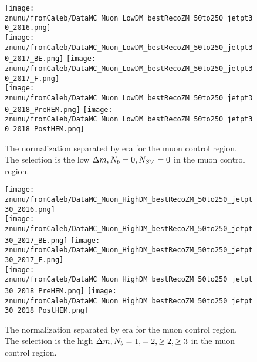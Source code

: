 \begin{figure}[!h]
	\begin{center}
    \texttt{[image: znunu/fromCaleb/DataMC\_Muon\_LowDM\_bestRecoZM\_50to250\_jetpt30\_2016.png]} \\
    \texttt{[image: znunu/fromCaleb/DataMC\_Muon\_LowDM\_bestRecoZM\_50to250\_jetpt30\_2017\_BE.png]} 
    \texttt{[image: znunu/fromCaleb/DataMC\_Muon\_LowDM\_bestRecoZM\_50to250\_jetpt30\_2017\_F.png]} \\
    \texttt{[image: znunu/fromCaleb/DataMC\_Muon\_LowDM\_bestRecoZM\_50to250\_jetpt30\_2018\_PreHEM.png]}
    \texttt{[image: znunu/fromCaleb/DataMC\_Muon\_LowDM\_bestRecoZM\_50to250\_jetpt30\_2018\_PostHEM.png]} \\
	\end{center}
	\caption[\Znunu{} Normalization in low \dm{} for muons]{The \Znunu{} normalization separated by era for the muon control region. The selection is the low $\Delta m, N_{b}=0, N_{SV}=0$ in the muon control region.
	 }
	\label{fig:znunu-norm-lm-muon}
\end{figure}

\begin{figure}[!h]
	\begin{center}
    \texttt{[image: znunu/fromCaleb/DataMC\_Muon\_HighDM\_bestRecoZM\_50to250\_jetpt30\_2016.png]} \\
    \texttt{[image: znunu/fromCaleb/DataMC\_Muon\_HighDM\_bestRecoZM\_50to250\_jetpt30\_2017\_BE.png]} 
    \texttt{[image: znunu/fromCaleb/DataMC\_Muon\_HighDM\_bestRecoZM\_50to250\_jetpt30\_2017\_F.png]} \\
    \texttt{[image: znunu/fromCaleb/DataMC\_Muon\_HighDM\_bestRecoZM\_50to250\_jetpt30\_2018\_PreHEM.png]}
    \texttt{[image: znunu/fromCaleb/DataMC\_Muon\_HighDM\_bestRecoZM\_50to250\_jetpt30\_2018\_PostHEM.png]} \\
	\end{center}
	\caption[\Znunu{} Normalization in high \dm{} for muons]{The \Znunu{} normalization separated by era for the muon control region. The selection is the high $\Delta m, N_{b}=1, =2, \geq2,\geq3$ in the muon control region.
	 }
	\label{fig:znunu-norm-hm-muon}
\end{figure}

